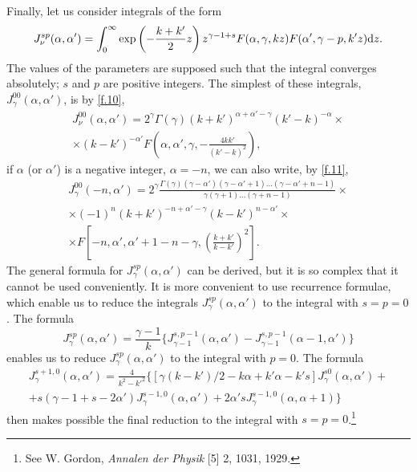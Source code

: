 Finally, let us consider integrals of the form
\begin{equation}\label{f.12}
J_\nu^{sp}(\alpha,\alpha')=\int_{0}^{\infty}\exp\left(-\frac{k+k'}{2}z \right)z^{\gamma-1+s}F(\alpha,\gamma,kz)F(\alpha',\gamma-p,k'z)\mathrm{d} z.
\end{equation}
The values of the parameters are supposed such that the integral converges absolutely; $ s $ and $ p $ are positive integers. The simplest of these integrals, $ J_\gamma^{00}(\alpha,\alpha') $, is by \eqref{f.10},
\begin{multline}\label{f.13}
J_\nu^{00}(\alpha,\alpha')=2^\gamma\Gamma(\gamma)(k+k')^{\alpha+\alpha'-\gamma}(k'-k)^{-\alpha}\times\\
\times(k-k')^{-\alpha'}F\left(\alpha,\alpha',\gamma,-\frac{4kk'}{(k'-k)^2} \right),
\end{multline}
if $\alpha$ (or $\alpha'$) is a negative integer, $ \alpha = -n $, we can also write, by \eqref{f.11},
\begin{multline}\label{f.14}
J_\gamma^{00}(-n,\alpha')=2^\gamma\frac{\Gamma(\gamma)(\gamma-\alpha')(\gamma-\alpha'+1)\dots(\gamma-\alpha'+n-1)}{\gamma(\gamma+1)\dots(\gamma+n-1)}\times\\
\times(-1)^n(k+k')^{-n+\alpha'-\gamma}(k-k')^{n-\alpha'}\times\\
\times F\left[-n,\alpha',\alpha'+1-n-\gamma,\left(\frac{k+k'}{k-k'} \right)^2\right].
\end{multline}
The general formula for $ J_\gamma^{sp}(\alpha, \alpha') $ can be derived, but it is so complex that it cannot be used conveniently. It is more convenient to use recurrence formulae, which enable us to reduce the integrals $ J_\gamma^{sp}(\alpha, \alpha') $ to the integral with $ s = p = 0 $. The formula
\begin{equation}\label{f.15}
J_\gamma^{sp}(\alpha,\alpha')=\frac{\gamma-1}{k}\{J_{\gamma-1}^{s,p-1}(\alpha,\alpha')-J_{\gamma-1}^{s,p-1}(\alpha-1,\alpha') \}
\end{equation}
enables us to reduce $ J_\gamma^{sp}(\alpha,\alpha') $ to the integral with $ p = 0 $. The formula
\begin{multline}\label{f.16}
J_\gamma^{s+1,0}(\alpha,\alpha')=\frac{4}{k^2-{k'}^2}\{[\gamma(k-k')/2-k\alpha+k'\alpha-k's]J_\gamma^{s0}(\alpha,\alpha')+\\
+s(\gamma-1+s-2\alpha')J_\gamma^{s-1,0}(\alpha,\alpha')+2\alpha' sJ_\gamma^{s-1,0}(\alpha,\alpha+1)\}
\end{multline}
then makes possible the final reduction to the integral with $ s = p = 0 $.\footnote{See W. Gordon, \textit{Annalen der Physik} [5] 2, 1031, 1929.}



